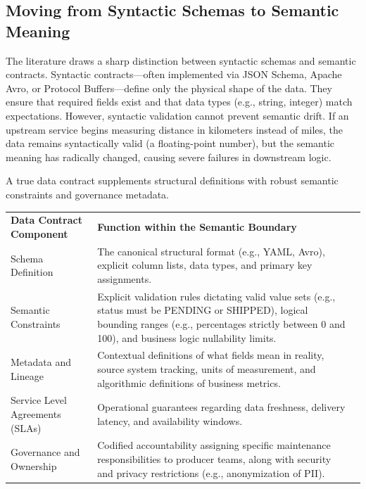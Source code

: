 \documentclass[11pt,letterpaper]{article}
\newcommand{\headingfont}{\sffamily}
\begin{document}
\begin{multicols*}{2}
\subsection{Moving from Syntactic Schemas to Semantic Meaning}
The literature draws a sharp distinction between syntactic schemas and semantic contracts. Syntactic contracts—often implemented via JSON Schema, Apache Avro, or Protocol Buffers—define only the physical shape of the data. They ensure that required fields exist and that data types (e.g., string, integer) match expectations. However, syntactic validation cannot prevent semantic drift. If an upstream service begins measuring distance in kilometers instead of miles, the data remains syntactically valid (a floating-point number), but the semantic meaning has radically changed, causing severe failures in downstream logic.

A true data contract supplements structural definitions with robust semantic constraints and governance metadata.

\begingroup
\renewcommand{\arraystretch}{1.5}
\begin{tabularx}{\columnwidth}{@{}P{0.3\columnwidth}YY@{}}
    \headingfont\bfseries Data Contract Component & \headingfont\bfseries Function within the Semantic Boundary \\
    \addlinespace[4pt]
    Schema Definition & The canonical structural format (e.g., YAML, Avro), explicit column lists, data types, and primary key assignments. \\
    \addlinespace[4pt]
    Semantic Constraints & Explicit validation rules dictating valid value sets (e.g., status must be PENDING or SHIPPED), logical bounding ranges (e.g., percentages strictly between 0 and 100), and business logic nullability limits. \\
    \addlinespace[4pt]
    Metadata and Lineage & Contextual definitions of what fields mean in reality, source system tracking, units of measurement, and algorithmic definitions of business metrics. \\
    \addlinespace[4pt]
    Service Level Agreements (SLAs) & Operational guarantees regarding data freshness, delivery latency, and availability windows. \\
    \addlinespace[4pt]
    Governance and Ownership & Codified accountability assigning specific maintenance responsibilities to producer teams, along with security and privacy restrictions (e.g., anonymization of PII). \\
\end{tabularx}
\label{tab:table5}
\endgroup

\end{multicols*}
\end{document}
